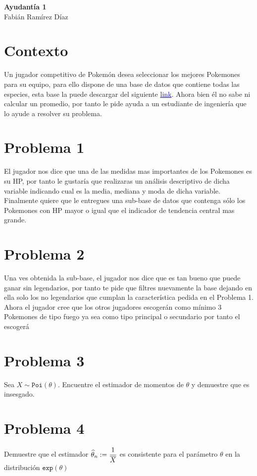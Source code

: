\begin{center}
    \huge{
    \textbf{
        Ayudantía 1
    }
    }\\
    \normalsize{
        Fabián Ramírez Díaz
    }
\end{center}

\section*{Contexto}
Un jugador competitivo de Pokemón desea seleccionar los mejores Pokemones para su equipo, para ello dispone de una base de datos que contiene todas las especies, esta base la puede descargar del siguiente \href{https://fabimath.github.io/mat044/ay1/pokemon.csv}{\textcolor{blue}{link}}. Ahora bien él no sabe ni calcular un promedio, por tanto le pide ayuda a un estudiante de ingeniería que lo ayude a resolver su problema. 
\section*{Problema 1}
El jugador nos dice que una de las medidas mas importantes de los Pokemones es su HP, por tanto le gustaría que realizaras un análisis descriptivo de dicha variable indicando cual es la media, mediana y moda de dicha variable. Finalmente quiere que le entregues una sub-base de datos que contenga sólo los Pokemones con HP mayor o igual que el indicador de tendencia central mas grande.
\section*{Problema 2}
Una ves obtenida la sub-base, el jugador nos dice que es tan bueno que puede ganar sin legendarios, por tanto te pide que filtres nuevamente la base dejando en ella solo los no legendarios que cumplan la característica pedida en el Problema 1. Ahora el jugador cree que los otros jugadores escogerán como mínimo 3 Pokemones de tipo fuego ya sea como tipo principal o secundario por tanto el escogerá 
\section*{Problema 3}
Sea $X\sim\texttt{Poi}(\theta)$. Encuentre el estimador de momentos de $\theta$ y demuestre que es insesgado.
\section*{Problema 4}
Demuestre que el estimador $\widehat{\theta}_n := \dfrac{1}{\overline{X}}$ es consistente para el parámetro $\theta$ en la distribución $\texttt{exp}(\theta)$

\vspace{1cm}
